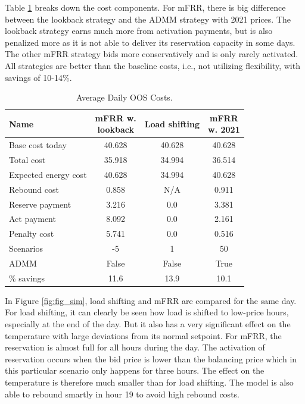 Table \ref{tab:cases_compared} breaks down the cost components. For mFRR, there is big difference between the lookback strategy and the ADMM strategy with 2021 prices. The lookback strategy earns much more from activation payments, but is also penalized more as it is not able to deliver its reservation capacity in some days. The other mFRR strategy bids more conservatively and is only rarely activated. All strategies are better than the baseline costs, i.e., not utilizing flexibility, with savings of 10-14\%.

\begin{flushleft}
    \begin{table}[!t]
        \caption{Average Daily OOS Costs.}
        \label{tab:cases_compared}
        \centering
        \begin{tabular}{lccc}
            \toprule
            Name                 & \thead{mFRR w.                   \\lookback} & Load shifting & \thead{mFRR \\w. 2021} \\
            \midrule
            Base cost today      & 40.628         & 40.628 & 40.628 \\
            Total cost           & 35.918         & 34.994 & 36.514 \\
            Expected energy cost & 40.628         & 34.994 & 40.628 \\
            Rebound cost         & 0.858          & N/A    & 0.911  \\
            Reserve payment      & 3.216          & 0.0    & 3.381  \\
            Act payment          & 8.092          & 0.0    & 2.161  \\
            Penalty cost         & 5.741          & 0.0    & 0.516  \\
            Scenarios            & -5             & 1      & 50     \\
            ADMM                 & False          & False  & True   \\
            \% savings           & 11.6           & 13.9   & 10.1   \\
            \bottomrule
        \end{tabular}
    \end{table}
\end{flushleft}

In Figure \ref{fig:fig_sim}, load shifting and mFRR are compared for the same day. For load shifting, it can clearly be seen how load is shifted to low-price hours, especially at the end of the day. But it also has a very significant effect on the temperature with large deviations from its normal setpoint. For mFRR, the reservation is almost full for all hours during the day. The activation of reservation occurs when the bid price is lower than the balancing price which in this particular scenario only happens for three hours. The effect on the temperature is therefore much smaller than for load shifting. The model is also able to rebound smartly in hour 19 to avoid high rebound costs.

